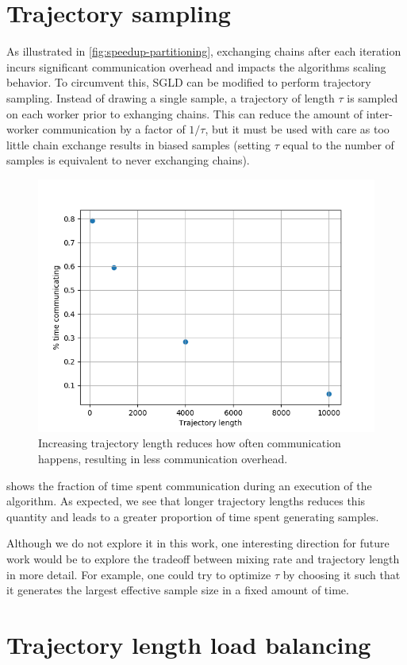 \documentclass{article}
\begin{document}
\section{Trajectory sampling}

As illustrated in \cref{fig:speedup-partitioning}, exchanging chains after each
iteration incurs significant communication overhead and impacts the algorithms
scaling behavior. To circumvent this, SGLD can be modified to perform
trajectory sampling. Instead of drawing a single sample, a trajectory of length
$\tau$ is sampled on each worker prior to exhanging chains. This can reduce the
amount of inter-worker communication by a factor of $1/\tau$,
but it must be used with care as too little chain exchange results in biased samples
(setting $\tau$ equal to the number of samples is equivalent to never exchanging chains).

\begin{figure}[htbp]
  \centering
  \includegraphics[width=0.5\linewidth]{poster-figures/traj_length_slowdown.png}
  \caption{Increasing trajectory length reduces how often communication happens, resulting in less
    communication overhead.}
  \label{fig:less-comm}
\end{figure}

 shows the fraction of time spent communication during an execution of the
algorithm. As expected, we see that longer trajectory lengths reduces this quantity and leads to
a greater proportion of time spent generating samples.

Although we do not explore it in this work, one interesting direction for
future work would be to explore the tradeoff between mixing rate and trajectory
length in more detail. For example, one could try to optimize $\tau$ by
choosing it such that it generates the largest effective sample size in a fixed
amount of time.

\section{Trajectory length load balancing}
\end{document}
